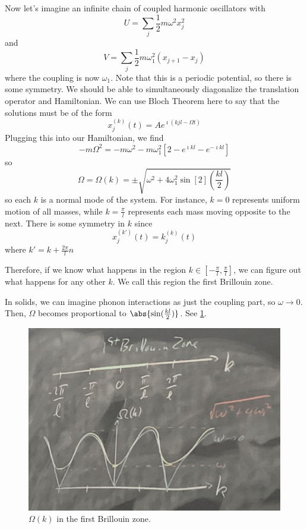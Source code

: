 \documentclass[a4paper,twoside,master.tex]{subfiles}
\begin{document}
Now let's imagine an infinite chain of coupled harmonic oscillators with
\begin{equation}
    U = \sum_j \frac{1}{2} m \omega^2 x_j^2
\end{equation}
and
\begin{equation}
    V = \sum_j \frac{1}{2} m \omega_1^2 \left( x_{j+1} - x_{j} \right)
\end{equation}
where the coupling is now $ \omega_1 $. Note that this is a periodic potential, so there is some symmetry. We should be able to simultaneously diagonalize the translation operator and Hamiltonian. We can use Bloch Theorem here to say that the solutions must be of the form
\begin{equation}
    x^{(k)}_j(t) = A e^{\imath \left( k jl - \Omega t \right)}
\end{equation}
Plugging this into our Hamiltonian, we find
\begin{equation}
    - m \Omega^2 = - m \omega^2 - m \omega^2_1 \left[ 2 - e^{\imath kl} - e^{- \imath kl} \right]
\end{equation}
so
\begin{equation}
    \Omega = \Omega(k) = \pm \sqrt{\omega^2 + 4 \omega_1^2 \sin[2](\frac{kl}{2})}
\end{equation}
so each $ k $ is a normal mode of the system. For instance, $ k = 0 $ represents uniform motion of all masses, while $ k = \frac{\pi}{l} $ represents each mass moving opposite to the next. There is some symmetry in $ k $ since
\begin{equation}
    x^{(k')}_j(t) = k^{(k)}_j(t)
\end{equation}
where $ k' = k + \frac{2 \pi}{l} n $

Therefore, if we know what happens in the region $ k \in \left[ - \frac{\pi}{l}, \frac{\pi}{l} \right] $, we can figure out what happens for any other $ k $. We call this region the first Brillouin zone.

In solids, we can imagine phonon interactions as just the coupling part, so $ \omega \to 0 $. Then, $ \Omega $ becomes proportional to $ \abs{\sin(\frac{kl}{2})} $. See \cref{fig:omega_of_k_phonon}.

\begin{figure}[h]
    \centering
    \includegraphics[width=\textwidth/2]{figures/lec_37_phonon_k.jpg}
    \caption{$ \Omega(k) $ in the first Brillouin zone.}
    \label{fig:omega_of_k_phonon}
\end{figure}
\end{document}
